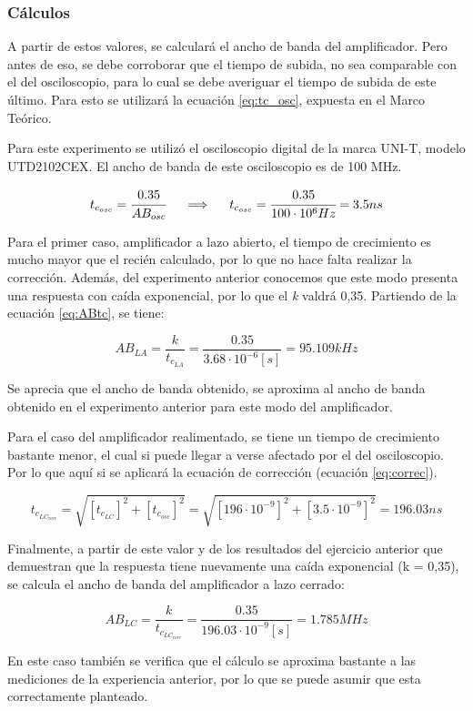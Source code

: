\subsubsection{Cálculos}

A partir de estos valores, se calculará el ancho de banda del amplificador. Pero antes de eso, se debe corroborar que el tiempo de subida, no sea comparable con el del osciloscopio, para lo cual se debe averiguar el tiempo de subida de este último. Para esto se utilizará la ecuación \ref{eq:tc_osc}, expuesta en el Marco Teórico. 

Para este experimento se utilizó el osciloscopio digital de la marca UNI-T, modelo UTD2102CEX. El ancho de banda de este osciloscopio es de 100 MHz.

\begin{equation*}
    t_{c_{osc}} = \cfrac{0.35}{AB_{osc}}
    \hspace{5mm} \Longrightarrow \hspace{5mm}
    t_{c_{osc}} = \cfrac{0.35}{100 \cdot 10^6 Hz} = 3.5 ns
\end{equation*}

Para el primer caso, amplificador a lazo abierto, el tiempo de crecimiento es mucho mayor que el recién calculado, por lo que no hace falta realizar la corrección. Además, del experimento anterior conocemos que este modo presenta una respuesta con caída exponencial, por lo que el \textit{k} valdrá 0,35. Partiendo de la ecuación \ref{eq:ABtc}, se tiene:

\begin{equation*}
    AB_{LA} = \frac{k}{t_{c_{LA}}} = \frac{0.35}{3.68 \cdot 10^{-6} [s]} = 95.109 kHz
\end{equation*}

Se aprecia que el ancho de banda obtenido, se aproxima al ancho de banda obtenido en el experimento anterior para este modo del amplificador.

Para el caso del amplificador realimentado, se tiene un tiempo de crecimiento bastante menor, el cual si puede llegar a verse afectado por el del osciloscopio. Por lo que aquí si se aplicará la ecuación de corrección (ecuación \ref{eq:correc}).

\begin{equation*}
     t_{c_{LC_{corr}}} = \sqrt{[t_{c_{LC}}]^2 + [t_{c_{osc}}]^2} = \sqrt{[196 \cdot 10^{-9}]^2 + [3.5 \cdot 10^{-9}]^2} = 196.03 ns
\end{equation*}

Finalmente, a partir de este valor y de los resultados del ejercicio anterior que demuestran que la respuesta tiene nuevamente una caída exponencial (k = 0,35), se calcula el ancho de banda del amplificador a lazo cerrado:

\begin{equation*}
    AB_{LC} = \frac{k}{t_{c_{LC_{corr}}}} = \frac{0.35}{196.03 \cdot 10^{-9} [s]} = 1.785 MHz
\end{equation*}

En este caso también se verifica que el cálculo se aproxima bastante a las mediciones de la experiencia anterior, por lo que se puede asumir que esta correctamente planteado.
